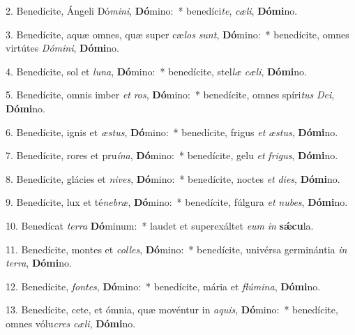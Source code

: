 
2. Benedícite, Ángeli Dó\textit{mi}\textit{ni}, \textbf{Dó}mino:~* benedíci\textit{te}, \textit{cæ}\textit{li}, \textbf{Dó}\textbf{mi}no.

3. Benedícite, aquæ omnes, quæ super cæ\textit{los} \textit{sunt}, \textbf{Dó}mino:~* benedícite, omnes virtútes \textit{Dó}\textit{mi}\textit{ni}, \textbf{Dó}\textbf{mi}no.

4. Benedícite, sol et \textit{lu}\textit{na}, \textbf{Dó}mino:~* benedícite, stel\textit{læ} \textit{cæ}\textit{li}, \textbf{Dó}\textbf{mi}no.

5. Benedícite, omnis imber \textit{et} \textit{ros}, \textbf{Dó}mino:~* benedícite, omnes spíri\textit{tus} \textit{De}\textit{i}, \textbf{Dó}\textbf{mi}no.

6. Benedícite, ignis et \textit{æs}\textit{tus}, \textbf{Dó}mino:~* benedícite, frigus \textit{et} \textit{æs}\textit{tus}, \textbf{Dó}\textbf{mi}no.

7. Benedícite, rores et pru\textit{í}\textit{na}, \textbf{Dó}mino:~* benedícite, gelu \textit{et} \textit{fri}\textit{gus}, \textbf{Dó}\textbf{mi}no.

8. Benedícite, glácies et \textit{ni}\textit{ves}, \textbf{Dó}mino:~* benedícite, noctes \textit{et} \textit{di}\textit{es}, \textbf{Dó}\textbf{mi}no.

9. Benedícite, lux et té\textit{ne}\textit{bræ}, \textbf{Dó}mino:~* benedícite, fúlgura \textit{et} \textit{nu}\textit{bes}, \textbf{Dó}\textbf{mi}no.

10. Benedícat \textit{ter}\textit{ra} \textbf{Dó}minum:~* laudet et superexáltet \textit{e}\textit{um} \textit{in} \textbf{s\'{\ae}}\textbf{cu}la.

11. Benedícite, montes et \textit{col}\textit{les}, \textbf{Dó}mino:~* benedícite, univérsa germinántia \textit{in} \textit{ter}\textit{ra}, \textbf{Dó}\textbf{mi}no.

12. Benedícite, \textit{fon}\textit{tes}, \textbf{Dó}mino:~* benedícite, mária et \textit{flú}\textit{mi}\textit{na}, \textbf{Dó}\textbf{mi}no.

13. Benedícite, cete, et ómnia, quæ movéntur in \textit{a}\textit{quis}, \textbf{Dó}mino:~* benedícite, omnes vólu\textit{cres} \textit{cæ}\textit{li}, \textbf{Dó}\textbf{mi}no.


